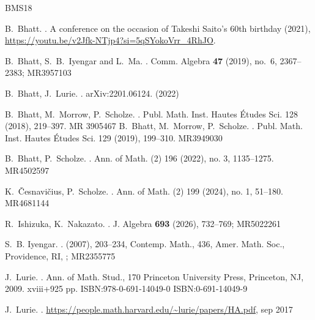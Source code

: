 \documentclass[11pt, a4paper]{amsart}
\theoremstyle{plain}
\theoremstyle{definition}
\begin{document}
\begin{thebibliography}{BMS18}

B.~Bhatt.
.
\newblock A conference on the occasion of Takeshi Saito's 60th birthday (2021), {\url{https://youtu.be/v2Jfk-NTjp4?si=5qSYokoVrr_4RhJO}}.

B.~Bhatt, S.~B.~Iyengar and L.~Ma.
.
\newblock Comm. Algebra {\bf 47} (2019), no.~6, 2367--2383; MR3957103


B.~Bhatt, J.~Lurie.
.
\newblock arXiv:2201.06124. (2022)

B.~Bhatt, M.~Morrow, P.~Scholze.
.
\newblock Publ. Math. Inst. Hautes Études Sci. 128 (2018), 219--397. MR 3905467
B.~Bhatt, M.~Morrow, P.~Scholze.
.
\newblock Publ. Math. Inst. Hautes Études Sci. 129 (2019), 199--310. MR3949030

B.~Bhatt, P.~Scholze.
.
\newblock
Ann. of Math. (2) 196 (2022), no. 3, 1135--1275. MR4502597

K.~Česnavičius, P.~Scholze.
.
\newblock Ann. of Math. (2) 199 (2024), no. 1, 51--180. MR4681144

R.~Ishizuka, K.~Nakazato.
.
\newblock J. Algebra {\bf 693} (2026), 732--769; MR5022261

S.~B. Iyengar.
.
 (2007), 203--234, Contemp. Math., 436, Amer. Math. Soc., Providence, RI, ; MR2355775

J.~Lurie.
.
\newblock 
Ann. of Math. Stud., 170
Princeton University Press, Princeton, NJ, 2009. xviii+925 pp.
ISBN:978-0-691-14049-0
ISBN:0-691-14049-9

J.~Lurie.
.
\newblock
{\url{https://people.math.harvard.edu/~lurie/papers/HA.pdf}, sep 2017}


\end{thebibliography}
\end{document}

